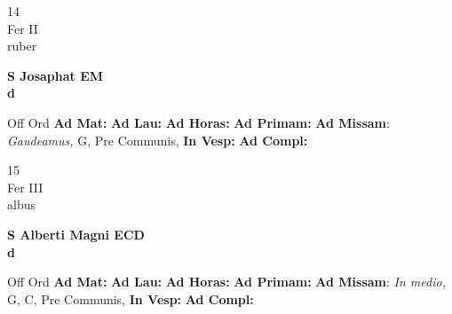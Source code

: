 \documentclass[10pt, openany]{book}
\begin{document}
        \begin{center}
            \begin{minipage}{3.5in}
                \vspace{2em}
                \begin{minipage}{0.5in}
                    {\Huge 14} \\
                    {\normalsize Fer II} \\
                    {\normalsize ruber}
                \end{minipage}
                \begin{minipage}{3.0in}
                    \textbf{ \large S Josaphat EM \\
                    \textnormal{\normalsize d}} \\ 
                \end{minipage}
                \begin{justify}Off Ord
                    \textbf{Ad Mat: }
                    \textbf{Ad Lau: }
                    \textbf{Ad Horas: }
                    \textbf{Ad Primam: }\textbf{Ad Missam}: \textit{Gaudeamus,} G, Pre Communis,  
                    \textbf{In Vesp: }
                    \textbf{Ad Compl: }
                \end{justify}
            \end{minipage}
        \end{center}
    
        \begin{center}
            \begin{minipage}{3.5in}
                \vspace{2em}
                \begin{minipage}{0.5in}
                    {\Huge 15} \\
                    {\normalsize Fer III} \\
                    {\normalsize albus}
                \end{minipage}
                \begin{minipage}{3.0in}
                    \textbf{ \large S Alberti Magni ECD \\
                    \textnormal{\normalsize d}} \\ 
                \end{minipage}
                \begin{justify}Off Ord
                    \textbf{Ad Mat: }
                    \textbf{Ad Lau: }
                    \textbf{Ad Horas: }
                    \textbf{Ad Primam: }\textbf{Ad Missam}: \textit{In medio,} G, C, Pre Communis,  
                    \textbf{In Vesp: }
                    \textbf{Ad Compl: }
                \end{justify}
            \end{minipage}
        \end{center}
    
\end{document}

